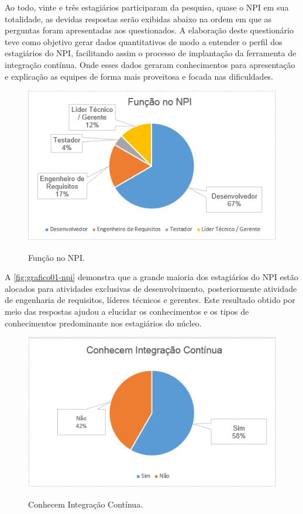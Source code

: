 Ao todo, vinte e três estagiários participaram da pesquisa, quase o NPI em sua totalidade, as devidas respostas serão exibidas abaixo na ordem em que as perguntas foram apresentadas aos questionados. A elaboração deste questionário teve como objetivo gerar dados quantitativos de modo a entender o perfil dos estagiários do NPI, facilitando assim o processo de implantação da ferramenta de integração contínua. Onde esses dados geraram conhecimentos para apresentação e explicação as equipes de forma mais proveitosa e focada nas dificuldades.


\begin{figure}[H]
\centering
\caption[Função NPI]{Função no NPI.}\includegraphics[scale=0.9]{./images/grafico-ci01}
\label{fig:grafico01-npi}
\end{figure}

A \autoref{fig:grafico01-npi} demonstra que a grande maioria dos estagiários do NPI estão alocados para atividades exclusivas de desenvolvimento, posteriormente atividade de engenharia de requisitos, líderes técnicos e gerentes. Este resultado obtido por meio das respostas ajudou a elucidar os conhecimentos e os tipos de conhecimentos predominante nos estagiários do núcleo.

\begin{figure}[H]
\centering
\caption[Conhecem Integração Contínua]{Conhecem Integração Contínua.}\includegraphics[scale=0.9]{./images/grafico-ci02}
\label{fig:grafico02-npi}
\end{figure}

